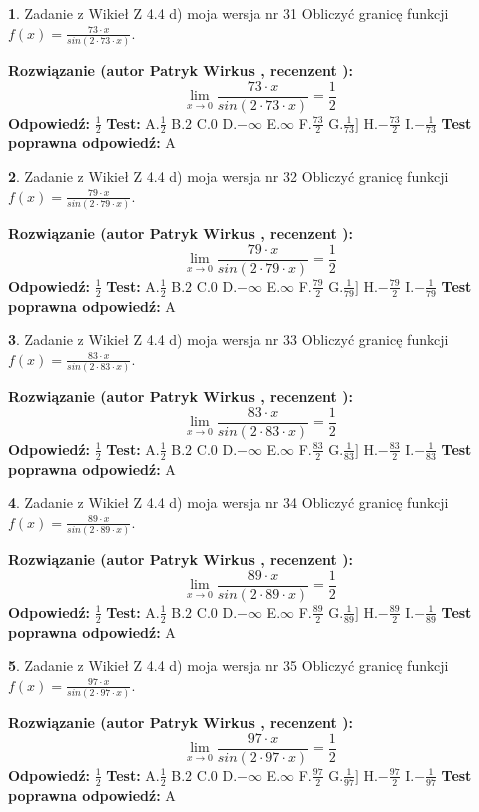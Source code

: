 \documentclass[12pt, a4paper]{article}
\theoremstyle{definition} %
\newtheorem{zad}{}
\newcommand{\zadStart}[1]{\begin{zad}#1\newline}
\newcommand{\zadStop}{\end{zad}}
\newcommand{\rozwStart}[2]{\noindent \textbf{Rozwiązanie (autor #1 , recenzent #2): }\newline}
\newcommand{\rozwStop}{\newline}
\newcommand{\odpStart}{\noindent \textbf{Odpowiedź:}\newline}
\newcommand{\odpStop}{\newline}
\newcommand{\testStart}{\noindent \textbf{Test:}\newline}
\newcommand{\testStop}{\newline}
\newcommand{\kluczStart}{\noindent \textbf{Test poprawna odpowiedź:}\newline}
\newcommand{\kluczStop}{\newline}
\begin{document}
\zadStart{Zadanie z Wikieł Z 4.4 d) moja wersja nr 31}
Obliczyć granicę funkcji $f(x)=\frac{73\cdot x}{sin(2 \cdot73\cdot x)}$.
\zadStop
\rozwStart{Patryk Wirkus}{}
$$\lim\limits_{x\to 0}\frac{73\cdot x}{sin(2 \cdot73\cdot x)}=\frac{1}{2}$$
\rozwStop
\odpStart
$\frac{1}{2}$
\odpStop
\testStart
A.$\frac{1}{2}$
B.$2$
C.$0$
D.$-\infty$
E.$\infty$
F.$\frac{73}{2}$
G.$\frac{1}{73}]$
H.$-\frac{73}{2}$
I.$-\frac{1}{73}$
\testStop
\kluczStart
A
\kluczStop



\zadStart{Zadanie z Wikieł Z 4.4 d) moja wersja nr 32}
Obliczyć granicę funkcji $f(x)=\frac{79\cdot x}{sin(2 \cdot79\cdot x)}$.
\zadStop
\rozwStart{Patryk Wirkus}{}
$$\lim\limits_{x\to 0}\frac{79\cdot x}{sin(2 \cdot79\cdot x)}=\frac{1}{2}$$
\rozwStop
\odpStart
$\frac{1}{2}$
\odpStop
\testStart
A.$\frac{1}{2}$
B.$2$
C.$0$
D.$-\infty$
E.$\infty$
F.$\frac{79}{2}$
G.$\frac{1}{79}]$
H.$-\frac{79}{2}$
I.$-\frac{1}{79}$
\testStop
\kluczStart
A
\kluczStop



\zadStart{Zadanie z Wikieł Z 4.4 d) moja wersja nr 33}
Obliczyć granicę funkcji $f(x)=\frac{83\cdot x}{sin(2 \cdot83\cdot x)}$.
\zadStop
\rozwStart{Patryk Wirkus}{}
$$\lim\limits_{x\to 0}\frac{83\cdot x}{sin(2 \cdot83\cdot x)}=\frac{1}{2}$$
\rozwStop
\odpStart
$\frac{1}{2}$
\odpStop
\testStart
A.$\frac{1}{2}$
B.$2$
C.$0$
D.$-\infty$
E.$\infty$
F.$\frac{83}{2}$
G.$\frac{1}{83}]$
H.$-\frac{83}{2}$
I.$-\frac{1}{83}$
\testStop
\kluczStart
A
\kluczStop



\zadStart{Zadanie z Wikieł Z 4.4 d) moja wersja nr 34}
Obliczyć granicę funkcji $f(x)=\frac{89\cdot x}{sin(2 \cdot89\cdot x)}$.
\zadStop
\rozwStart{Patryk Wirkus}{}
$$\lim\limits_{x\to 0}\frac{89\cdot x}{sin(2 \cdot89\cdot x)}=\frac{1}{2}$$
\rozwStop
\odpStart
$\frac{1}{2}$
\odpStop
\testStart
A.$\frac{1}{2}$
B.$2$
C.$0$
D.$-\infty$
E.$\infty$
F.$\frac{89}{2}$
G.$\frac{1}{89}]$
H.$-\frac{89}{2}$
I.$-\frac{1}{89}$
\testStop
\kluczStart
A
\kluczStop



\zadStart{Zadanie z Wikieł Z 4.4 d) moja wersja nr 35}
Obliczyć granicę funkcji $f(x)=\frac{97\cdot x}{sin(2 \cdot97\cdot x)}$.
\zadStop
\rozwStart{Patryk Wirkus}{}
$$\lim\limits_{x\to 0}\frac{97\cdot x}{sin(2 \cdot97\cdot x)}=\frac{1}{2}$$
\rozwStop
\odpStart
$\frac{1}{2}$
\odpStop
\testStart
A.$\frac{1}{2}$
B.$2$
C.$0$
D.$-\infty$
E.$\infty$
F.$\frac{97}{2}$
G.$\frac{1}{97}]$
H.$-\frac{97}{2}$
I.$-\frac{1}{97}$
\testStop
\kluczStart
A
\kluczStop
\end{document}
